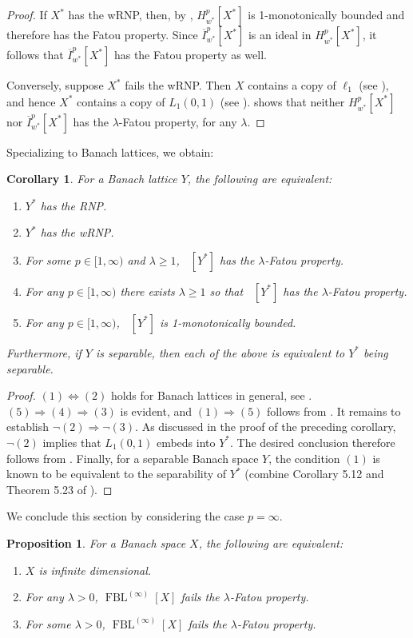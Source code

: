 \documentclass{amsart}
\theoremstyle{plain}
\newtheorem{proposition}[theorem]{Proposition}
\newtheorem{corollary}[theorem]{Corollary}
\theoremstyle{definition}
\numberwithin{equation}{section}
\DeclareMathOperator{\FBL}{FBL}
\DeclareMathOperator{\FBLp}{FBL^{\mathit{(p)}}}
\newcommand{\Hp}{H_{w^*}^{p}}
\newcommand{\Ip}{\overline{I}_{w^*}^{p}}
\begin{document}
\begin{proof}
    If $X^*$ has the wRNP, then, by , $\Hp[X^*]$ is 1-monotonically bounded and therefore has the Fatou property. Since $\Ip[X^*]$ is an ideal in $\Hp[X^*]$, it follows that $\Ip[X^*]$ has the Fatou property as well. 
    
    Conversely, suppose $X^*$ fails the wRNP. Then $X$ contains a copy of $\ell_1$ (see \cite{Musial}), and hence $X^*$ contains a copy of $L_1(0, 1)$ (see \cite{Hag73}).   shows that neither $\Hp[X^*]$ nor $\Ip[X^*]$ has the $\lambda$-Fatou property, for any $\lambda$.
\end{proof}

Specializing to Banach lattices, we obtain:

\begin{corollary}\label{dual of sep lattice}
For a Banach lattice $Y$, the following are equivalent:
\begin{enumerate}
 \item $Y^*$ has the RNP.
 \item $Y^*$ has the wRNP.
 \item For some $p \in [1,\infty)$ and $\lambda \geq 1$, $\FBLp[Y^*]$ has the $\lambda$-Fatou property.
 \item For any $p \in [1,\infty)$ there exists $\lambda \geq 1$ so that $\FBLp[Y^*]$ has the $\lambda$-Fatou property.
 \item For any $p \in [1,\infty)$, $\FBLp[Y^*]$ is 1-monotonically bounded.
\end{enumerate} Furthermore, if $Y$ is separable, then each of the above is equivalent to $Y^*$ being separable.
\end{corollary}
\begin{proof}
 $(1) \Leftrightarrow (2)$ holds for Banach lattices in general, see \cite{GS}. 
 $(5) \Rightarrow (4) \Rightarrow (3)$ is evident, and $(1) \Rightarrow (5)$ follows from . It remains to establish $\lnot (2) \Rightarrow \lnot (3)$. As discussed in the proof of the preceding corollary, $\lnot (2)$ implies that $L_1(0, 1)$ embeds into $Y^*$. The desired conclusion therefore follows from .
Finally, for a separable Banach space $Y$, the condition $(1)$ is known to be equivalent to the separability of $Y^*$ (combine Corollary 5.12 and Theorem 5.23 of \cite{BL}). 	
\end{proof}

We conclude this section by considering the case $p = \infty$.
\begin{proposition}
For a Banach space $X$, the following are equivalent:
\begin{enumerate}
    \item $X$ is infinite dimensional.
    \item For any $\lambda > 0$, $\FBL^{(\infty)}[X]$ fails the $\lambda$-Fatou property.
    \item For some $\lambda > 0$, $\FBL^{(\infty)}[X]$ fails the $\lambda$-Fatou property.
\end{enumerate}
\end{proposition}
\end{document}
